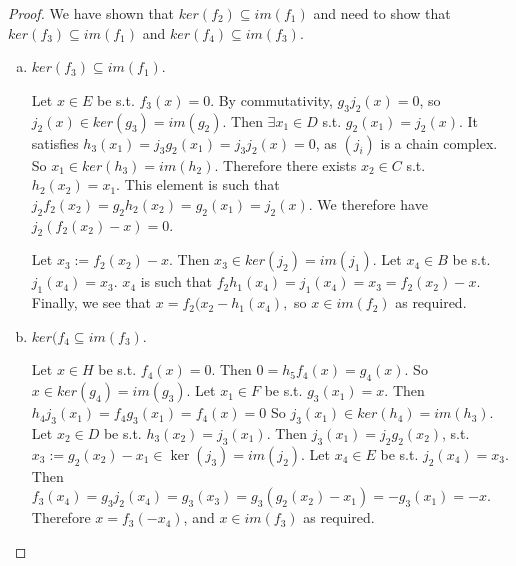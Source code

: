 \begin{proof}
We have shown that $ker(f_2)\subseteq im(f_1)$ and need to show that $ker(f_3)\subseteq im(f_1)$ and $ker(f_4)\subseteq im(f_3)$.

\begin{enumerate}[(a)]
\item $ker(f_3)\subseteq im(f_1)$.

Let $x\in E$ be s.t. $f_3(x)=0$. By commutativity, $g_3j_2(x)=0$, so $j_2(x)\in ker(g_3)=im(g_2)$. Then $\exists x_1\in D$ s.t. $g_2(x_1)=j_2(x)$. It satisfies $h_3(x_1)=j_3g_2(x_1)=j_3j_2(x)=0$, as $(j_i)$ is a chain complex. So $x_1\in ker(h_3)=im(h_2)$. Therefore there exists $x_2\in C$ s.t. $h_2(x_2)=x_1$. This element is such that $j_2f_2(x_2)=g_2h_2(x_2)=g_2(x_1)=j_2(x)$. We therefore have $j_2(f_2(x_2)-x)=0$.

Let $x_3:=f_2(x_2)-x$. Then $x_3\in ker(j_2)=im(j_1)$. Let $x_4\in B$ be s.t. $j_1(x_4)=x_3$. $x_4$ is such that $f_2h_1(x_4)=j_1(x_4)=x_3=f_2(x_2)-x$.
Finally, we see that $x=f_2(x_2-h_1(x_4),$ so $x\in im(f_2)$ as required.

\item $ker(f_4\subseteq im(f_3)$. 

Let $x\in H$ be s.t. $f_4(x)=0$. Then $0=h_5f_4(x)=g_4(x)$. So $x\in ker(g_4)=im(g_3)$. Let $x_1\in F$ be s.t. $g_3(x_1)=x$. Then $h_4j_3(x_1)=f_4g_3(x_1)=f_4(x)=0$
So $j_3(x_1)\in ker(h_4)=im(h_3)$. Let $x_2\in D$ be s.t. $h_3(x_2)=j_3(x_1)$. Then $j_3(x_1)=j_2g_2(x_2)$, s.t. $x_3:=g_2(x_2)-x_1\in \ker(j_3)=im(j_2)$. Let $x_4\in E$ be s.t. $j_2(x_4)=x_3$. Then $f_3(x_4)=g_3j_2(x_4)=g_3(x_3)=g_3(g_2(x_2)-x_1)=-g_3(x_1)=-x$. Therefore $x=f_3(-x_4)$, and $x\in im(f_3)$ as required.
\end{enumerate}\end{proof}